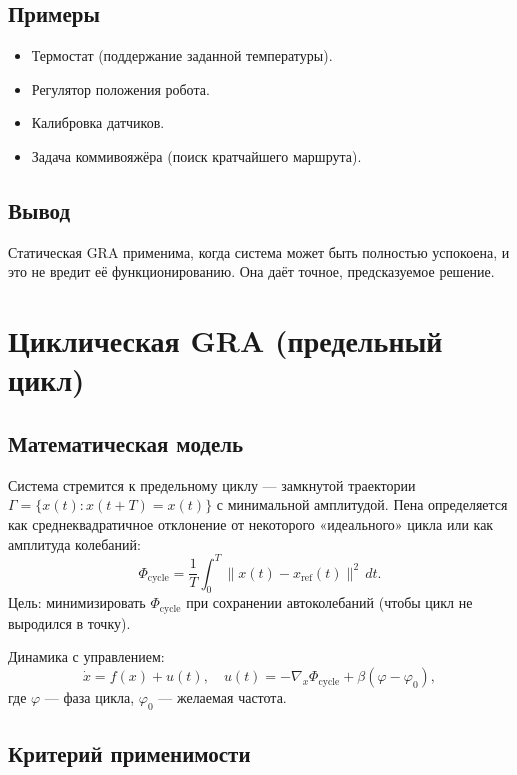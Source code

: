 \documentclass[12pt,a4paper]{article}
\begin{document}
\subsection{Примеры}
\begin{itemize}
    \item Термостат (поддержание заданной температуры).
    \item Регулятор положения робота.
    \item Калибровка датчиков.
    \item Задача коммивояжёра (поиск кратчайшего маршрута).
\end{itemize}

\subsection{Вывод}
Статическая GRA применима, когда система может быть полностью успокоена, и это не вредит её функционированию. Она даёт точное, предсказуемое решение.

\section{Циклическая GRA (предельный цикл)}
\label{sec:cyclic}

\subsection{Математическая модель}

Система стремится к предельному циклу — замкнутой траектории $\Gamma = \{x(t): x(t+T) = x(t)\}$ с минимальной амплитудой. Пена определяется как среднеквадратичное отклонение от некоторого «идеального» цикла или как амплитуда колебаний:
\begin{equation}
    \Phi_{\text{cycle}} = \frac{1}{T} \int_0^T \| x(t) - x_{\text{ref}}(t) \|^2 \, dt.
\end{equation}
Цель: минимизировать $\Phi_{\text{cycle}}$ при сохранении автоколебаний (чтобы цикл не выродился в точку).

Динамика с управлением:
\begin{equation}
    \dot{x} = f(x) + u(t), \quad u(t) = -\nabla_x \Phi_{\text{cycle}} + \beta (\varphi - \varphi_0),
\end{equation}
где $\varphi$ — фаза цикла, $\varphi_0$ — желаемая частота.

\subsection{Критерий применимости}
\end{document}
